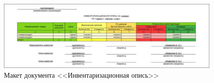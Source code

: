 

\begin{figure}[!h]
    \centering

    \includegraphics[width=18cm]
    {assets/layouts/DOC_InventOpis'.jpg}

    \caption{Макет документа <<Инвентаризационная опись>>}

    \label{fig:DOC_InventOpis}
\end{figure}

